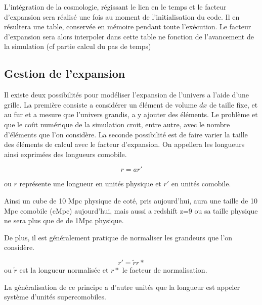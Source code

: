 
L'intégration de la cosmologie, régissant le lien en le temps et le facteur d'expansion sera réalisé une fois au moment de l'initialisation du code. %
Il en résultera une table, conservée en mémoire pendant toute l'exécution.
Le facteur d'expansion sera alors interpoler dans cette table ne fonction de l'avancement de la simulation (cf partie calcul du pas de temps) %

\subsection{Gestion de l'expansion}
Il existe deux possibilités pour modéliser l'expansion de l'univers a l'aide d'une grille.
La première consiste a considérer un élément de volume $dx$ de taille fixe, et au fur et a mesure que l'univers grandis, a y ajouter des éléments.
Le problème et que le coût numérique de la simulation croit, entre autre, avec le nombre d'éléments que l'on considère.
La seconde possibilité est de faire varier la taille des éléments de calcul avec le facteur d'expansion.
On appellera les longueurs ainsi exprimées des longueurs comobile.

\begin{equation}
r=a r'
\end{equation}

ou $r$ représente une longueur en unités physique et $r'$ en unités comobile.

Ainsi un cube de 10 Mpc physique de coté, pris aujourd'hui, aura une taille de 10 Mpc comobile (cMpc) aujourd'hui, mais aussi a redshift z=9 ou sa taille physique ne sera plus que de de 1Mpc physique.

De plus, il est généralement pratique de normaliser les grandeurs que l'on considère. 

\begin{equation}
r'=\tilde{r}r*
\end{equation}
ou $\tilde{r}$ est la longueur normalisée et $r*$ le facteur de normalisation.

La généralisation de ce principe a d'autre unités que la longueur est appeler système d'unités supercomobiles.
\citep{martel_convenient_1998}

